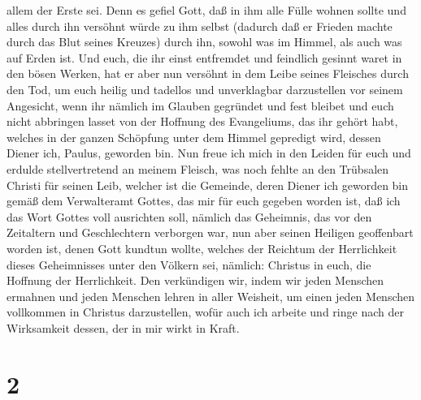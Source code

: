 allem der Erste sei.  Denn es gefiel Gott, daß in ihm
alle Fülle wohnen sollte  und alles durch ihn versöhnt
würde zu ihm selbst (dadurch daß er Frieden machte durch das Blut seines
Kreuzes) durch ihn, sowohl was im Himmel, als auch was auf Erden ist.
 Und euch, die ihr einst entfremdet und feindlich gesinnt
waret in den bösen Werken, hat er aber nun versöhnt in dem Leibe seines
Fleisches durch den Tod,  um euch heilig und tadellos und
unverklagbar darzustellen vor seinem Angesicht,  wenn ihr
nämlich im Glauben gegründet und fest bleibet und euch nicht abbringen
lasset von der Hoffnung des Evangeliums, das ihr gehört habt, welches in
der ganzen Schöpfung unter dem Himmel gepredigt wird, dessen Diener ich,
Paulus, geworden bin.  Nun freue ich mich in den Leiden
für euch und erdulde stellvertretend an meinem Fleisch, was noch fehlte
an den Trübsalen Christi für seinen Leib, welcher ist die Gemeinde,
 deren Diener ich geworden bin gemäß dem Verwalteramt
Gottes, das mir für euch gegeben worden ist, daß ich das Wort Gottes
voll ausrichten soll,  nämlich das Geheimnis, das vor den
Zeitaltern und Geschlechtern verborgen war, nun aber seinen Heiligen
geoffenbart worden ist,  denen Gott kundtun wollte,
welches der Reichtum der Herrlichkeit dieses Geheimnisses unter den
Völkern sei, nämlich: Christus in euch, die Hoffnung der Herrlichkeit.
 Den verkündigen wir, indem wir jeden Menschen ermahnen
und jeden Menschen lehren in aller Weisheit, um einen jeden Menschen
vollkommen in Christus darzustellen,  wofür auch ich
arbeite und ringe nach der Wirksamkeit dessen, der in mir wirkt in
Kraft.

\hypertarget{section-1}{%
\section{2}\label{section-1}}

